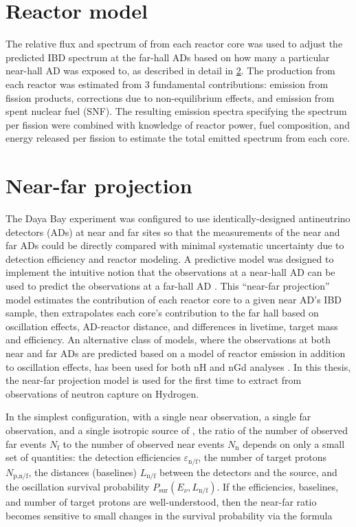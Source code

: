 \section{Reactor model}
\label{sec:reactor}

The relative flux and spectrum of \nuebar{} from each reactor core was used
to adjust the predicted IBD spectrum at the far-hall ADs
based on how many \nuebar{} a particular near-hall AD was exposed to,
as described in detail in \cref{sec:prediction}.
The \nuebar{} production from each reactor was estimated from 3 fundamental contributions:
emission from fission products, corrections due to non-equilibrium effects,
and emission from spent nuclear fuel (SNF).
The resulting emission spectra specifying the spectrum per fission
were combined with knowledge of reactor power, fuel composition,
and energy released per fission
to estimate the total emitted \nuebar{} spectrum from each core.

\section{Near-far projection}
\label{sec:prediction}

The Daya Bay experiment was configured to use
identically-designed antineutrino detectors (ADs) at near and far sites
so that the measurements of the near and far ADs could be directly compared
with minimal systematic uncertainty due to detection efficiency
and reactor modeling.
A predictive model was designed to implement the intuitive notion
that the observations at a near-hall AD can be used to predict
the observations at a far-hall AD \cite{p12e_fitter,p14a_fitter}.
This ``near-far projection'' model estimates the contribution of each reactor core
to a given near AD's IBD sample,
then extrapolates each core's contribution to the far hall
based on oscillation effects, AD-reactor distance,
and differences in livetime, target mass and efficiency.
An alternative class of models,
where the observations at both near and far ADs
are predicted based on a model of reactor \nuebar{} emission
in addition to oscillation effects,
has been used for both nH and nGd analyses \cite{nh2016, ngd2016}.
In this thesis, the near-far projection model is used for the first time
to extract \thetaot{} from observations of neutron capture on Hydrogen.


In the simplest configuration, with a single near observation,
a single far observation, and a single isotropic source of \nuebar,
the ratio of the number of observed far events $N_\text{f}$
to the number of observed near events $N_\text{n}$
depends on only a small set of quantities:
the detection efficiencies $\varepsilon_\text{n/f}$,
the number of target protons $N_\text{p,n/f}$,
the distances (baselines) $L_\text{n/f}$ between the detectors and the source,
and the oscillation survival probability $P_\text{sur}(E_\nu, L_\text{n/f})$.
If the efficiencies, baselines, and number of target protons are well-understood,
then the near-far ratio becomes sensitive
to small changes in the survival probability via the formula \cite{ngd2016}

